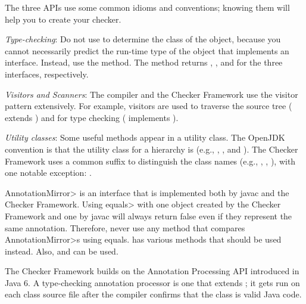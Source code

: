 The three APIs use some common idioms and conventions; knowing them will
help you to create your checker.

\emph{Type-checking}:
Do not use  to determine the class of the object,
because you cannot necessarily predict the run-time type of the object that
implements an interface.  Instead, use the  method.  The
method returns ,
, and 
for the three interfaces, respectively.

\emph{Visitors and Scanners}:
The compiler and the Checker Framework use the visitor pattern
extensively. For example, visitors are used to traverse the source tree
( extends
) and for type
checking ( implements
).

\emph{Utility classes}:
Some useful methods appear in a utility class.  The OpenJDK convention is that
the utility class for a  hierarchy is  (e.g.,
, , and
).  The Checker Framework uses a common
 suffix to distinguish the class names (e.g., ,
, ), with one
notable exception: .



\<AnnotationMirror> is an interface that is implemented both by javac and
the Checker Framework. Using \<equals> with one object created by the
Checker Framework and one by javac will always return false even if they
represent the same annotation. Therefore, never use any method that
compares \<AnnotationMirror>s using equals.  has various
methods that should be used instead. Also,
 and
 can be used.



The Checker Framework builds on the Annotation Processing API
introduced in Java 6.  A type-checking annotation processor is one that extends
; it gets run on each class
source file after the compiler confirms that the class is valid Java code.

